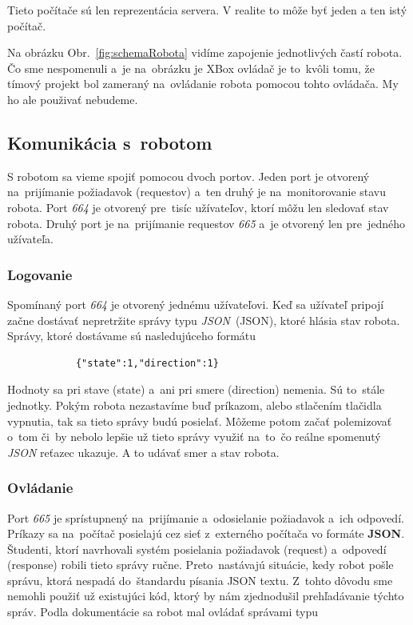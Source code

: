 \noindent Tieto počítače sú len reprezentácia servera. V realite to môže byť jeden a ten istý počítač.

\noindent Na obrázku Obr.~\ref{fig:schemaRobota} vidíme zapojenie jednotlivých častí robota. Čo sme nespomenuli a~je na~obrázku je XBox ovládač
je to~kvôli tomu, že tímový projekt bol zameraný na~ovládanie robota pomocou tohto ovládača. My ho ale použivať nebudeme.

\subsection{Komunikácia s~robotom}

S robotom sa vieme spojiť pomocou dvoch portov. Jeden port je otvorený na~prijímanie požiadavok (requestov) a~ten druhý je na~monitorovanie
stavu robota. Port \textit{664} je otvorený pre~tisíc užívateľov, ktorí môžu len sledovať stav robota. Druhý port je na~prijímanie requestov
\textit{665} a~je otvorený len pre~jedného užívateľa.

\subsubsection{Logovanie}

	Spomínaný port \textit{664} je otvorený jednému užívateľovi. Keď sa užívateľ pripojí začne dostávať nepretržite správy typu
	\textit{JSON}~(\acrlong{JSON}), ktoré hlásia stav robota. Správy, ktoré dostávame sú nasledujúceho formátu

	\begin{lstlisting}
			{"state":1,"direction":1}
	\end{lstlisting}

	Hodnoty sa pri stave (state) a~ani pri smere (direction) nemenia. Sú to~stále jednotky. Pokým robota nezastavíme buď príkazom, alebo
	stlačením tlačidla vypnutia, tak sa tieto správy budú posielať. Môžeme potom začať polemizovať o~tom či~by nebolo lepšie už tieto správy
	využiť na~to~čo reálne spomenutý \textit{JSON} reťazec ukazuje. A to udávať smer a stav robota.

\subsubsection{Ovládanie}

	Port \textit{665} je sprístupnený na~prijímanie a~odosielanie požiadavok a~ich odpovedí. Príkazy sa na~počítač posielajú cez sieť z~externého
	počítača vo formáte \textbf{JSON}. Študenti, ktorí navrhovali systém posielania požiadavok (request) a~odpovedí (response) robili tieto správy
	ručne. Preto~nastávajú situácie, kedy robot pošle správu, ktorá nespadá do~štandardu písania JSON textu. Z~tohto dôvodu sme nemohli použiť už
	existujúci kód, ktorý by nám zjednodušil prehľadávanie týchto správ. Podla dokumentácie sa robot mal ovládať správami typu~\cite{BMdoc}

